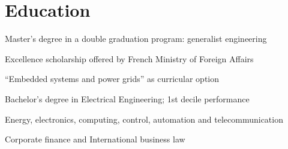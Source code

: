 \documentclass[]{deedy-resume}
\begin{document}
\begin{minipage}[t]{0.66\textwidth}


\section{Education}

\vspace{\topsep}
\begin{tightemize}\item Master's degree in a double graduation program: generalist engineering
\item Excellence scholarship offered by French Ministry of Foreign Affairs
\item ``Embedded systems and power grids'' as curricular option
\end{tightemize}
\sectionsep

\begin{tightemize}\item Bachelor's degree in Electrical Engineering; 1st decile performance
\item Energy, electronics, computing, control, automation and telecommunication
\end{tightemize}
\sectionsep

\begin{tightemize}\item Corporate finance and International business law
\end{tightemize}

\end{minipage} 
\end{document}
